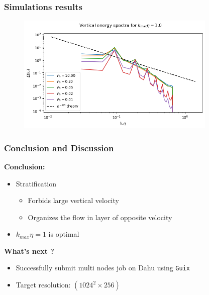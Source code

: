 \documentclass{beamer}
\begin{document}
\begin{frame}
\frametitle{Simulations results}

\begin{figure}
	\centering
	\includegraphics[width=0.85\textwidth]{fig/multi_Ekz_kz.png}
\end{figure}

\end{frame}


\begin{frame}
\frametitle{Conclusion and Discussion}

\textbf{Conclusion:}
\begin{itemize}
	\item Stratification 
	\begin{itemize}
		\item Forbids large vertical velocity
		\item Organizes the flow in layer of opposite velocity
	\end{itemize}
	\item $k_{max} \eta = 1$ is optimal
\end{itemize}

\textbf{What's next ?}
\begin{itemize}
	\item Successfully submit multi nodes job on Dahu using \texttt{Guix}
	\item Target resolution: $(1024^2 \times 256)$
\end{itemize}


\end{frame}
\end{document}
